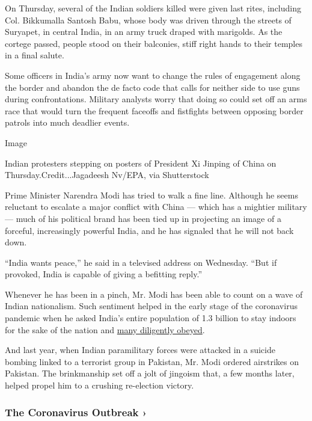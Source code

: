 On Thursday, several of the Indian soldiers killed were given last
rites, including Col. Bikkumalla Santosh Babu, whose body was driven
through the streets of Suryapet, in central India, in an army truck
draped with marigolds. As the cortege passed, people stood on their
balconies, stiff right hands to their temples in a final salute.

Some officers in India's army now want to change the rules of engagement
along the border and abandon the de facto code that calls for neither
side to use guns during confrontations. Military analysts worry that
doing so could set off an arms race that would turn the frequent
faceoffs and fistfights between opposing border patrols into much
deadlier events.

Image

Indian protesters stepping on posters of President Xi Jinping of China
on Thursday.Credit...Jagadeesh Nv/EPA, via Shutterstock

Prime Minister Narendra Modi has tried to walk a fine line. Although he
seems reluctant to escalate a major conflict with China --- which has a
mightier military --- much of his political brand has been tied up in
projecting an image of a forceful, increasingly powerful India, and he
has signaled that he will not back down.

``India wants peace,'' he said in a televised address on Wednesday.
``But if provoked, India is capable of giving a befitting reply.''

Whenever he has been in a pinch, Mr. Modi has been able to count on a
wave of Indian nationalism. Such sentiment helped in the early stage of
the coronavirus pandemic when he asked India's entire population of 1.3
billion to stay indoors for the sake of the nation and
\href{https://economictimes.indiatimes.com/news/politics-and-nation/in-lockdown-delhi-is-frozen-in-fear-and-the-present-tense/articleshow/75512122.cms}{many
diligently obeyed}.

And last year, when Indian paramilitary forces were attacked in a
suicide bombing linked to a terrorist group in Pakistan, Mr. Modi
ordered airstrikes on Pakistan. The brinkmanship set off a jolt of
jingoism that, a few months later, helped propel him to a crushing
re-election victory.

\href{https://www.nytimes.com/news-event/coronavirus?action=click\&pgtype=Article\&state=default\&region=MAIN_CONTENT_3\&context=storylines_faq}{}

\hypertarget{the-coronavirus-outbreak-}{%
\subsubsection{The Coronavirus Outbreak
›}\label{the-coronavirus-outbreak-}}

